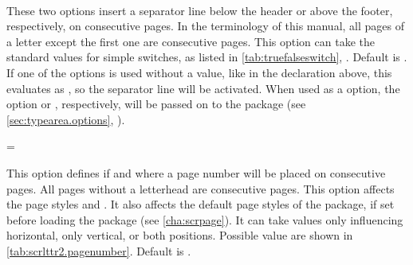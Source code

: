\begin{Declaration}
  \\
\end{Declaration}
%
%
These two options insert a separator line below the header or above
the footer, respectively, on consecutive pages. In the terminology of
this manual, all pages of a letter except the first one are
consecutive pages.  This option can take the standard values for
simple switches, as listed in
\autoref{tab:truefalseswitch},
. Default is
. If one of the options is used without a value, like in
the declaration above, this evaluates as , so the
separator line will be activated. When used as a 
option, the option  or ,
respectively, will be passed on to the  package (see
\autoref{sec:typearea.options},
).
%
%
%

\begin{Declaration}
  =
\end{Declaration}
%
This option defines if and where a page number will be placed on
consecutive pages. All pages without a letterhead are consecutive
pages. This option affects the page styles
 and . It also affects the default page
styles of the  package, if set before loading the
package (see \autoref{cha:scrpage}). It can take values only
influencing horizontal, only vertical, or both positions. Possible
value are shown in \autoref{tab:scrlttr2.pagenumber}. Default is
.

